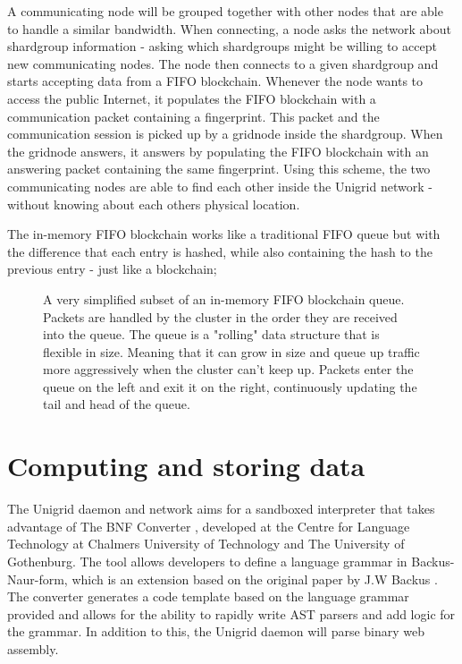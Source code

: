 \documentclass[10pt,a4paper,final]{article}
\begin{document}
A communicating node will be grouped together with other nodes that are able to handle a similar bandwidth. When connecting, a node asks the network about \gls{shardgroup} information - asking which \glspl{shardgroup} might be willing to accept new communicating nodes. The node then connects to a given \gls{shardgroup} and starts accepting data from a FIFO blockchain. Whenever the node wants to access the public Internet, it populates the FIFO blockchain with a communication packet containing a fingerprint. This packet and the communication session is picked up by a \gls{gridnode} inside the \gls{shardgroup}. When the \gls{gridnode} answers, it answers by populating the FIFO blockchain with an answering packet containing the same fingerprint. Using this scheme, the two communicating nodes are able to find each other inside the Unigrid network - without knowing about each others physical location.

The in-memory FIFO blockchain works like a traditional FIFO queue but with the difference that each entry is hashed, while also containing the hash to the previous entry - just like a blockchain;

\begin{figure}[H]
\centering
{}
\caption{A very simplified subset of an in-memory FIFO blockchain queue. Packets are handled by the cluster in the order they are received into the queue. The queue is a "rolling" data structure that is flexible in size. Meaning that it can grow in size and queue up traffic more aggressively when the cluster can't keep up. Packets enter the queue on the left and exit it on the right, continuously updating the tail and head of the queue.}
\end{figure}

\section{Computing and storing data}
The Unigrid daemon and network aims for a sandboxed interpreter that takes advantage of The BNF Converter \cite{bnfc}, developed at the Centre for Language Technology at Chalmers University of Technology and The University of Gothenburg. The tool allows developers to define a language grammar in Backus-Naur-form, which is an extension based on the original paper by J.W Backus \cite{backus1959}. The converter generates a code template based on the language grammar provided and allows for the ability to rapidly write AST parsers and add logic for the grammar. In addition to this, the Unigrid daemon will parse binary web assembly.
\end{document}
